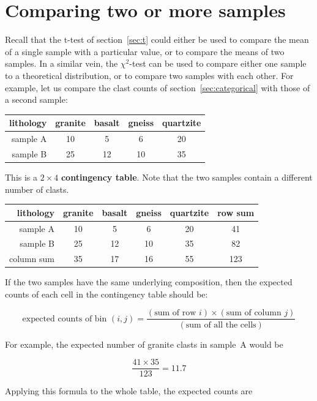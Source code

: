 \section{Comparing two or more samples}
\label{sec:contingency}

Recall that the t-test of section~\ref{sec:t} could either be used to
compare the mean of a single sample with a particular value, or to
compare the means of two samples. In a similar vein, the $\chi^2$-test
can be used to compare either one sample to a theoretical
distribution, or to compare two samples with each other. For example,
let us compare the clast counts of section~\ref{sec:categorical} with
those of a second sample:

\begin{center}
  \begin{tabular}{r|cccc}
lithology & granite & basalt & gneiss & quartzite  \\ \hline
sample A & 10 & 5 & 6 & 20 \\
sample B & 25 & 12 & 10 & 35
  \end{tabular}
  \label{tab:observedclasts}
\end{center}

This is a ${2}\times{4}$ \textbf{contingency table}. Note that the two
samples contain a different number of clasts.

\begin{center}
  \begin{tabular}{r|cccc|c}
lithology & granite & basalt & gneiss & quartzite & row sum \\ \hline
sample A & 10 & 5 & 6 & 20 & 41\\
sample B & 25 & 12 & 10 & 35 & 82 \\ \hline
column sum & 35 & 17 & 16 & 55 & 123
  \end{tabular}
\end{center}

If the two samples have the same underlying composition, then the
expected counts of each cell in the contingency table should be:

\[
\mbox{expected counts of bin }(i,j) =
\frac{(\mbox{sum of row }i)\times(\mbox{sum of column }j)}
     {(\mbox{sum of all the cells})}
\]

For example, the expected number of granite clasts in sample~A would be

\[
\frac{41\times35}{123}=11.7
\]

Applying this formula to the whole table, the expected counts are

